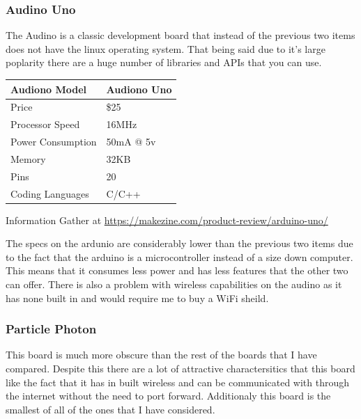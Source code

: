 \documentclass{article}
\begin{document}
\subsubsection{Audino Uno}

The Audino is a classic development board that instead of the previous two items does not have the linux
operating system. That being said due to it's large poplarity there are a huge number of libraries and
APIs that you can use. \\ 

\begin{tabularx}{\textwidth}{| X | X |}
    \hline
    Audiono Model    &   Audiono Uno \\ \hline
    Price            &       \$25    \\ \hline
    Processor Speed  &      16MHz    \\ \hline
    Power Consumption&    50mA @ 5v  \\ \hline
    Memory           &      32KB     \\ \hline
    Pins             &       20      \\ \hline
    Coding Languages &     C/C++     \\ \hline
\end{tabularx}
\newline

Information Gather at \url{https://makezine.com/product-review/arduino-uno/}


The specs on the ardunio are considerably lower than the previous two items due to the fact that
the arduino is a microcontroller instead of a size down computer. This means that it consumes less
power and has less features that the other two can offer. There is also a problem with wireless
capabilities on the audino as it has none built in and would require me to buy a WiFi sheild.

\subsubsection{Particle Photon}

This board is much more obscure than the rest of the boards that I have compared. Despite this there
are a lot of attractive charactersitics that this board like the fact that it has in built wireless
and can be communicated with through the internet without the need to port forward. Additionaly this
board is the smallest of all of the ones that I have considered. \\
\end{document}
